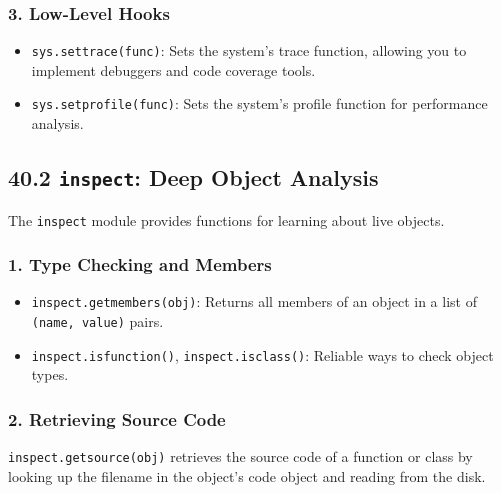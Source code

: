 \hypertarget{low-level-hooks}{%
\subsubsection{3. Low-Level Hooks}\label{low-level-hooks}}

\begin{itemize}
\tightlist
\item
  \passthrough{\lstinline!sys.settrace(func)!}: Sets the system's trace
  function, allowing you to implement debuggers and code coverage tools.
\item
  \passthrough{\lstinline!sys.setprofile(func)!}: Sets the system's
  profile function for performance analysis.
\end{itemize}

\hypertarget{inspect-deep-object-analysis}{%
\subsection{\texorpdfstring{40.2 \texttt{inspect}: Deep Object
Analysis}{40.2 inspect: Deep Object Analysis}}\label{inspect-deep-object-analysis}}

The \passthrough{\lstinline!inspect!} module provides functions for
learning about live objects.

\hypertarget{type-checking-and-members}{%
\subsubsection{1. Type Checking and
Members}\label{type-checking-and-members}}

\begin{itemize}
\tightlist
\item
  \passthrough{\lstinline!inspect.getmembers(obj)!}: Returns all members
  of an object in a list of \passthrough{\lstinline!(name, value)!}
  pairs.
\item
  \passthrough{\lstinline!inspect.isfunction()!},
  \passthrough{\lstinline!inspect.isclass()!}: Reliable ways to check
  object types.
\end{itemize}

\hypertarget{retrieving-source-code}{%
\subsubsection{2. Retrieving Source Code}\label{retrieving-source-code}}

\passthrough{\lstinline!inspect.getsource(obj)!} retrieves the source
code of a function or class by looking up the filename in the object's
code object and reading from the disk.

